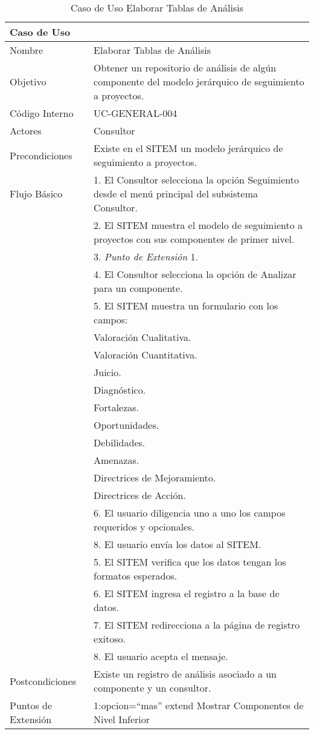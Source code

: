 \begin{table}
\begin{center}
\begin{tabular}{|l|p{10cm}|}
\hline
\textbf{Caso de Uso}&\\
\hline
Nombre & Elaborar Tablas de Análisis\\
\hline
Objetivo & Obtener un repositorio de análisis de algún componente del modelo jerárquico de seguimiento a proyectos.\\
\hline
Código Interno & UC-GENERAL-004 \\
\hline
Actores & Consultor\\
\hline
Precondiciones & Existe en el SITEM un modelo jerárquico de seguimiento a proyectos.\\
\hline
Flujo Básico & 1. El Consultor selecciona la opción Seguimiento desde el menú principal del subsistema Consultor.\\
& 2. El SITEM muestra el modelo de seguimiento a proyectos con sus componentes de primer nivel.\\
& 3. \textit{Punto de Extensión} 1.\\
& 4. El Consultor selecciona la opción de Analizar para un componente.\\
& 5. El SITEM muestra un formulario con los campos:\\
& Valoración Cualitativa.\\
& Valoración Cuantitativa.\\
& Juicio.\\
& Diagnóstico.\\
& Fortalezas.\\
& Oportunidades.\\
& Debilidades.\\
& Amenazas.\\
& Directrices de Mejoramiento.\\
& Directrices de Acción.\\
& 6. El usuario diligencia uno a uno los campos requeridos y opcionales.\\
& 8. El usuario envía los datos al SITEM.\\
& 5. El SITEM verifica que los datos tengan los formatos esperados.\\
& 6. El SITEM ingresa el registro a la base de datos.\\
& 7. El SITEM redirecciona a la página de registro exitoso.\\
& 8. El usuario acepta el mensaje.\\
\hline
Postcondiciones & Existe un registro de análisis asociado a un componente y un consultor.\\
\hline
Puntos de Extensión & 1:opcion=“mas” extend Mostrar Componentes de Nivel Inferior\\
\hline
\end{tabular}
\caption{Caso de Uso Elaborar Tablas de Análisis}
\label{casouso4} 
\end{center}
\end{table}

